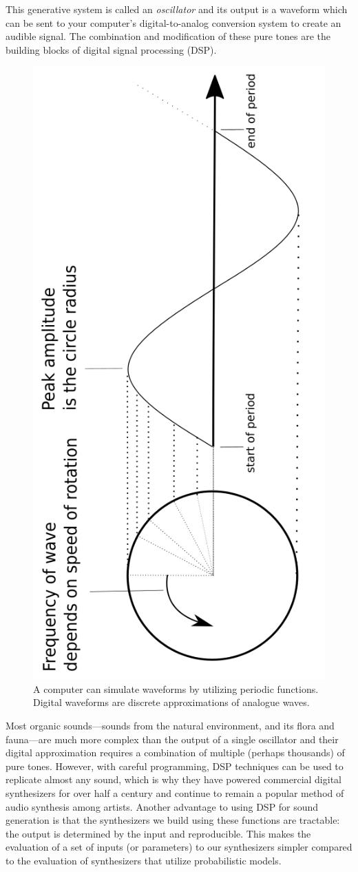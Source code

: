 \documentclass[\main/thesis.tex]{subfiles}
\begin{document}
This generative system is called an \textit{oscillator} and its output is a waveform which can be sent to your computer's digital-to-analog conversion system to create an audible signal. The combination and modification of these pure tones are the building blocks of digital signal processing (DSP).

\begin{figure}[h]
\label{fig_example_sine}
\centering
\includegraphics[width=0.45\linewidth,angle =-90 ]{images/periodic_function.png}
\caption{A computer can simulate waveforms by utilizing periodic functions. Digital waveforms are discrete approximations of analogue waves. \cite{mitchell2009basicsynthChap5} }
\end{figure}


 Most organic sounds---sounds from the natural environment, and its flora and fauna---are much more complex than the output of a single oscillator and their digital approximation requires a combination of multiple (perhaps thousands) of pure tones. However, with careful programming, DSP techniques can be used to replicate almost any sound, which is why they have powered commercial digital synthesizers for over half a century \cite{jenkins2019analog} and continue to remain a popular method of audio synthesis among artists. Another advantage to using DSP for sound generation is that the synthesizers we build using these functions are tractable: the output is determined by the input and reproducible. This makes the evaluation of a set of inputs (or parameters) to our synthesizers  simpler compared to the evaluation of synthesizers that utilize probabilistic models.
 
\end{document}
